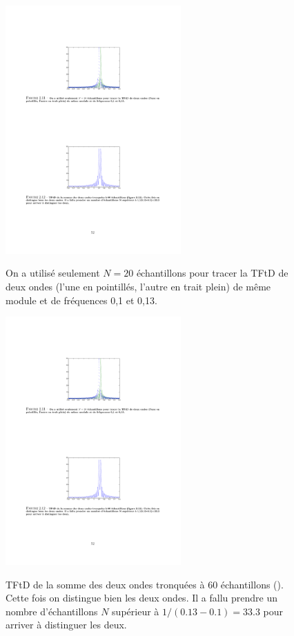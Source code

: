 \begin{figure}
  \centering
  \includegraphics[width=0.6\textwidth]{Figures/Figure2-11}\\
  \caption{On a utilis\'{e} seulement $N=20$ \'{e}chantillons pour tracer la TFtD de deux ondes (l'une en pointill\'{e}s, l'autre en trait plein) de m\^{e}me module et de fr\'{e}quences 0,1 et 0,13.}\label{fig:figure2-11}
\end{figure}


\begin{figure}
  \centering
  \includegraphics[width=0.6\textwidth]{Figures/Figure2-12}\\
  \caption{TFtD de la somme des deux ondes tronqu\'{e}es \`{a} 60 \'{e}chantillons (). Cette fois on distingue bien les deux ondes. Il a fallu prendre un nombre d'\'{e}chantillons $N$ sup\'{e}rieur \`{a} $1/(0.13-0.1)=33.3$ pour arriver \`{a} distinguer les deux.}\label{fig:figure2-12}
\end{figure}


